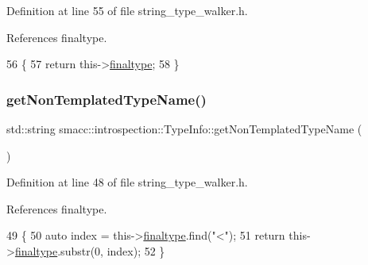 Definition at line 55 of file string\+\_\+type\+\_\+walker.\+h.



References finaltype.


\begin{DoxyCode}
56     \{
57         \textcolor{keywordflow}{return} this->\hyperlink{classsmacc_1_1introspection_1_1TypeInfo_aa4010ed427e12db443e08ab16a3de243}{finaltype};
58     \}
\end{DoxyCode}
\mbox{\label{classsmacc_1_1introspection_1_1TypeInfo_adf059b6105291f4d6402068e8b122365}} 
\subsubsection{\texorpdfstring{get\+Non\+Templated\+Type\+Name()}{getNonTemplatedTypeName()}}
{\footnotesize\ttfamily std\+::string smacc\+::introspection\+::\+Type\+Info\+::get\+Non\+Templated\+Type\+Name (\begin{DoxyParamCaption}{ }\end{DoxyParamCaption})\hspace{0.3cm}{\ttfamily [inline]}}



Definition at line 48 of file string\+\_\+type\+\_\+walker.\+h.



References finaltype.


\begin{DoxyCode}
49     \{
50         \textcolor{keyword}{auto} index = this->\hyperlink{classsmacc_1_1introspection_1_1TypeInfo_aa4010ed427e12db443e08ab16a3de243}{finaltype}.find(\textcolor{stringliteral}{"<"});
51         \textcolor{keywordflow}{return} this->\hyperlink{classsmacc_1_1introspection_1_1TypeInfo_aa4010ed427e12db443e08ab16a3de243}{finaltype}.substr(0, index);
52     \}
\end{DoxyCode}
\mbox{\label{classsmacc_1_1introspection_1_1TypeInfo_a47d65b6c61499d7ae8ab9f6325c84837}} 
